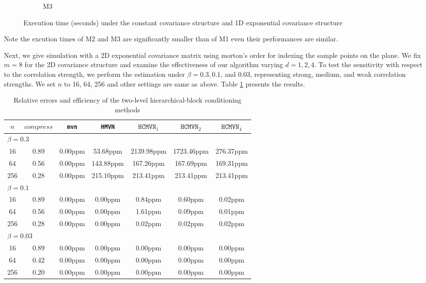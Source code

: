 \begin{figure}
\begin{subfigure}[b]{0.3\textwidth}
					\caption{M3}
			\end{subfigure}
			\caption{Execution time (seconds) under the constant covariance structure and 1D exponential covariance structure}\label{fig:table3_time}
\end{figure}	

Note the excution times of M2 and M3 are significantly smaller than of M1 even their performances are similar.

Next, we give simulation with a 2D exponential covariance matrix using morton's order for indexing the sample points on the plane. We fix $m = 8$ for the 2D covariance structure and examine the effectiveness of our algorithm varying $d =1,2,4$. To test the sensitivity with respect to the correlation strength, we perform the estimation under $\beta = 0.3, 0.1$, and 0.03, representing strong, medium, and weak correlation strengths. We set $n$ to 16, 64, 256 and other settings are same as above. Table \ref{tab:table5} presents the results.

\begin{table}[ht]
	\centering
	{
		\begin{tabular}{@{}ccccccc@{}}
			\toprule
			$n$ & $compress$ & \texttt{mvn} & \texttt{HMVN} & $\texttt{HCMVN}_1$ & $\texttt{HCMVN}_2$ & $\texttt{HCMVN}_4$ \\ \midrule

			
			\multicolumn{7}{l}{$\beta=0.3$} \\ \midrule
			16 & 0.89 & 0.00ppm & 53.68ppm & 2139.98ppm & 1723.46ppm & 276.37ppm \\ 
			64 & 0.56 & 0.00ppm & 143.88ppm & 167.26ppm & 167.69ppm & 169.31ppm \\ 
			256 & 0.28 & 0.00ppm & 215.10ppm & 213.41ppm & 213.41ppm & 213.41ppm \\ 
			\midrule
			\multicolumn{7}{l}{$\beta=0.1$} \\ \midrule
			16 & 0.89 & 0.00ppm & 0.00ppm & 0.84ppm & 0.60ppm & 0.02ppm \\ 
			64 & 0.56 & 0.00ppm & 0.00ppm & 1.61ppm & 0.09ppm & 0.01ppm \\ 
			256 & 0.28 & 0.00ppm & 0.00ppm & 0.02ppm & 0.02ppm & 0.02ppm \\ 
			\midrule
			\multicolumn{7}{l}{$\beta=0.03$} \\ \midrule
			16 & 0.89 & 0.00ppm & 0.00ppm & 0.00ppm & 0.00ppm & 0.00ppm \\ 
			64 & 0.42 & 0.00ppm & 0.00ppm & 0.00ppm & 0.00ppm & 0.00ppm \\ 
			256 & 0.20 & 0.00ppm & 0.00ppm & 0.00ppm & 0.00ppm & 0.00ppm \\ 
			\bottomrule
		\end{tabular}%
	}
	\caption{Relative errors and efficiency of the two-level hierarchical-block conditioning methods}
	\label{tab:table5}
\end{table}

